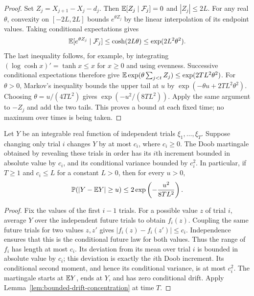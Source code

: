 \begin{proof}
Set $Z_j=X_{j+1}-X_j-d_j$. Then
$\mathbb E[Z_j\mid\mathcal F_j]=0$ and $|Z_j|\le2L$. For any real
$\theta$, convexity on $[-2L,2L]$ bounds $e^{\theta Z_j}$ by the
linear interpolation of its endpoint values. Taking conditional
expectations gives
\[
 \mathbb E[e^{\theta Z_j}\mid\mathcal F_j]
 \le\cosh(2L\theta)\le\exp(2L^2\theta^2).
\]
The last inequality follows, for example, by integrating
$(\log\cosh x)'=\tanh x\le x$ for $x\ge0$ and using evenness.
Successive conditional expectations therefore give
$\mathbb E\exp(\theta\sum_{j<t}Z_j)\le\exp(2TL^2\theta^2)$.
For $\theta>0$, Markov's inequality bounds the upper tail at $u$ by
$\exp(-\theta u+2TL^2\theta^2)$. Choosing
$\theta=u/(4TL^2)$ gives $\exp(-u^2/(8TL^2))$.
Apply the same argument to $-Z_j$ and add the two tails. This proves a
bound at each fixed time; no maximum over times is being taken.
\end{proof}

\begin{lemma}
\label{lem:independent-trial-jumps}
Let $Y$ be an integrable real function of independent trials
$\xi_1,\ldots,\xi_T$. Suppose changing only trial $i$ changes $Y$
by at most $c_i$, where $c_i\ge0$. The Doob martingale obtained by
revealing these trials in order has its $i$th increment bounded in
absolute value by $c_i$, and its conditional variance bounded by $c_i^2$.
In particular, if $T\ge1$ and $c_i\le L$ for a constant $L>0$, then
for every $u>0$,
\[
 \mathbb P(|Y-\mathbb E Y|\ge u)\le
 2\exp\left(-\frac{u^2}{8TL^2}\right).
\]
\end{lemma}

\begin{proof}
Fix the values of the first $i-1$ trials. For a possible value $z$ of
trial $i$, average $Y$ over the independent future trials to obtain
$f_i(z)$. Coupling the same future trials for two values $z,z'$ gives
$|f_i(z)-f_i(z')|\le c_i$. Independence ensures that this is the
conditional future law for both values. Thus the range of $f_i$ has
length at most $c_i$. Its deviation from its mean over trial $i$ is
bounded in absolute value by $c_i$; this deviation is exactly the
$i$th Doob increment. Its conditional second moment, and hence its
conditional variance, is at most $c_i^2$. The martingale starts at
$\mathbb E Y$, ends at $Y$, and has zero conditional drift. Apply
Lemma~\ref{lem:bounded-drift-concentration} at time $T$.
\end{proof}
